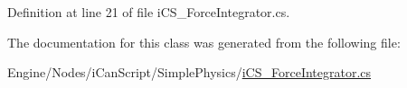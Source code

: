 Definition at line 21 of file i\+C\+S\+\_\+\+Force\+Integrator.\+cs.



The documentation for this class was generated from the following file\+:\begin{DoxyCompactItemize}
\item 
Engine/\+Nodes/i\+Can\+Script/\+Simple\+Physics/\hyperlink{i_c_s___force_integrator_8cs}{i\+C\+S\+\_\+\+Force\+Integrator.\+cs}\end{DoxyCompactItemize}
